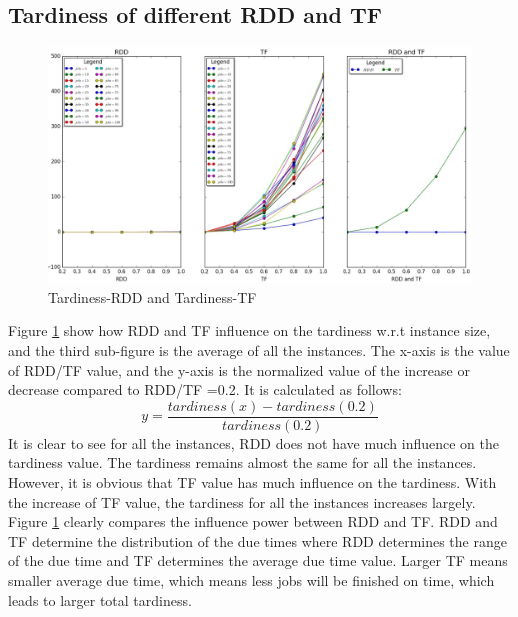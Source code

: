 \documentclass[11pt]{article}
\begin{document}
\subsection{Tardiness of different RDD and TF}
\begin{figure}[H]
\hspace*{-1cm} 
  \centering%
    \includegraphics[width=1.2\textwidth]{RDD_TF_tardiness.png}
	\caption{Tardiness-RDD and Tardiness-TF}
	\label{fig:RDD_TF_t}
\end{figure}
Figure \ref{fig:RDD_TF_t} show how RDD and TF influence on the tardiness w.r.t instance size, and the third sub-figure is the average of all the instances. The x-axis is the value of RDD/TF value, and the y-axis is the normalized value of the increase or decrease compared to RDD/TF =0.2. It is calculated as follows:
$$ y= \frac{tardiness(x)-tardiness(0.2)}{tardiness(0.2)}$$
It is clear to see for all the instances, RDD does not have much influence on the tardiness value. The tardiness remains almost the same for all the instances. However, it is obvious that TF value has much influence on the tardiness. With the increase of TF value, the tardiness for all the instances increases largely. Figure \ref{fig:RDD_TF_t} clearly compares the influence power between RDD and TF. RDD and TF determine the distribution of the due times where RDD determines the range of the due time and TF determines the average due time value. Larger TF means smaller average due time, which means less jobs will be finished on time, which leads to larger total tardiness.
\end{document}
